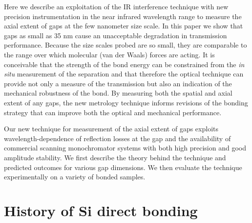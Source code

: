 \documentclass[osajnl,preprint,showpacs,superscriptaddress,12pt]{revtex4-1} %
\begin{document}
Here we describe an exploitation of the IR interference technique with new precision instrumentation in the near infrared wavelength range to measure the axial extent of gaps at the few nanometer size scale.  In this paper we show that gaps as small as 35 nm cause an unacceptable degradation in transmission performance.  Because the size scales probed are so small, they are comparable to the range over which molecular (van der Waals) forces are acting.  It is conceivable that the strength of the bond energy can be constrained from the \emph{in situ} measurement of the separation and that therefore the optical technique can provide not only a measure of the transmission but also an indication of the mechanical robustness of the bond.  By measuring both the spatial and axial extent of any gaps, the new metrology technique informs revisions of the bonding strategy that can improve both the optical and mechanical performance.  


Our new technique for measurement of the axial extent of gaps exploits wavelength-dependence of reflection losses at the gap and the availability of commercial scanning monochromator systems with both high precision and good amplitude stability.  We first describe the theory behind the technique and predicted outcomes for various gap dimensions.  We then evaluate the technique experimentally on a variety of bonded samples.  


\section{History of Si direct bonding}
\label{secHistory}
\end{document}
